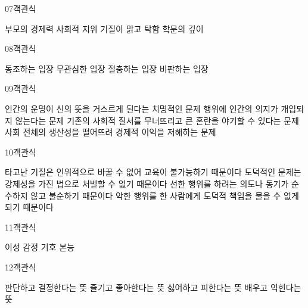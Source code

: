 \documentclass[fs9,seriesRus]{korfarm-base}
\begin{document}
\begin{kfQBlock}{07}{객관식}
\begin{kfChoices}
\kfChoice 부모의 경제력
\kfChoice 사회적 지위
\kfChoice 기질이 맑고 탁함
\kfChoice 학문의 깊이
\end{kfChoices}
\end{kfQBlock}
\begin{kfQBlock}{08}{객관식}
\begin{kfChoices}
\kfChoice 동조하는 입장
\kfChoice 무관심한 입장
\kfChoice 절충하는 입장
\kfChoice 비판하는 입장
\end{kfChoices}
\end{kfQBlock}
\begin{kfQBlock}{09}{객관식}
\begin{kfChoices}
\kfChoice 인간의 운명이 신의 뜻을 거스르게 된다는 치명적인 문제
\kfChoice 행위에 인간의 의지가 개입되지 않는다는 문제
\kfChoice 기존의 사회적 질서를 무너뜨리고 큰 혼란을 야기할 수 있다는 문제
\kfChoice 사회 전체의 생산성을 떨어뜨려 경제적 이익을 저해하는 문제
\end{kfChoices}
\end{kfQBlock}
\begin{kfQBlock}{10}{객관식}
\begin{kfChoices}
\kfChoice 타고난 기질은 인위적으로 바꿀 수 없어 교육이 불가능하기 때문이다
\kfChoice 도덕적인 문제는 강제성을 가진 법으로 처벌할 수 없기 때문이다
\kfChoice 선한 행위를 하려는 의도나 동기가 순수하지 않고 불순하기 때문이다
\kfChoice 악한 행위를 한 사람에게 도덕적 책임을 물을 수 없게 되기 때문이다
\end{kfChoices}
\end{kfQBlock}
\begin{kfQBlock}{11}{객관식}
\begin{kfChoices}
\kfChoice 이성
\kfChoice 감정
\kfChoice 기호
\kfChoice 본능
\end{kfChoices}
\end{kfQBlock}
\begin{kfQBlock}{12}{객관식}
\begin{kfChoices}
\kfChoice 판단하고 결정한다는 뜻
\kfChoice 즐기고 좋아한다는 뜻
\kfChoice 싫어하고 피한다는 뜻
\kfChoice 배우고 익힌다는 뜻
\end{kfChoices}
\end{kfQBlock}
\end{document}
